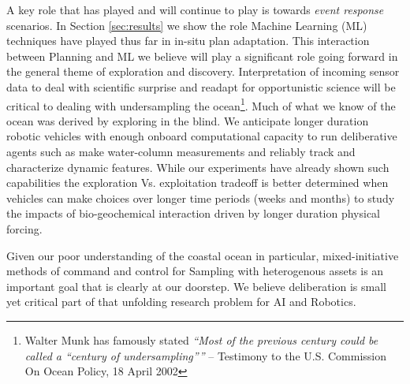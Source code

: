 A key role that \rx has played and will continue to play is towards
\emph{event response} scenarios. In Section \ref{sec:results} we show
the role Machine Learning (ML) techniques have played thus far in
in-situ plan adaptation. This interaction between Planning and ML we
believe will play a significant role going forward in the general
theme of exploration and discovery. Interpretation of incoming sensor
data to deal with scientific surprise and readapt for opportunistic
science will be critical to dealing with undersampling the
ocean\footnote{Walter Munk has famously stated \emph{``Most of the
    previous century could be called a “century of undersampling”''}
  -- Testimony to the U.S. Commission On Ocean Policy, 18 April
  2002}. Much of what we know of the ocean was derived by exploring in
the blind. We anticipate longer duration robotic vehicles with enough
onboard computational capacity to run deliberative agents such as \rx
make water-column measurements and reliably track and characterize
dynamic features. While our experiments have already shown such
capabilities the exploration Vs. exploitation tradeoff is better
determined when vehicles can make choices over longer time periods
(weeks and months) to study the impacts of bio-geochemical interaction
driven by longer duration physical forcing. 

Given our poor understanding of the coastal ocean in particular,
mixed-initiative methods of command and control for Sampling with
heterogenous assets is an important goal that is clearly at our
doorstep. We believe deliberation is small yet critical part of that
unfolding research problem for AI and Robotics.